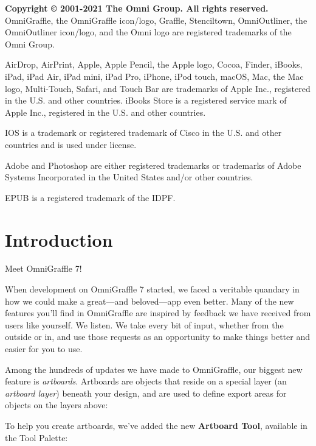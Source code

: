 \documentclass[../main.tex]{subfiles}
\begin{document}
\textbf{Copyright \copyright{} 2001-2021 The Omni Group. All rights reserved.}\\ OmniGraffle,
the OmniGraffle icon/logo, Graffle, Stenciltown, OmniOutliner, the OmniOutliner icon/logo, and
the Omni logo are registered trademarks of the Omni Group.

AirDrop, AirPrint, Apple, Apple Pencil, the Apple logo, Cocoa, Finder, iBooks, iPad, iPad Air,
iPad mini, iPad Pro, iPhone, iPod touch, macOS, Mac, the Mac logo, Multi-Touch, Safari, and
Touch Bar are trademarks of Apple Inc., registered in the U.S. and other countries. iBooks
Store is a registered service mark of Apple Inc., registered in the U.S. and other countries.

IOS is a trademark or registered trademark of Cisco in the U.S. and other countries and is used
under license.

Adobe and Photoshop are either registered trademarks or trademarks of Adobe Systems Incorporated
in the United States and/or other countries.

EPUB is a registered trademark of the IDPF.

\chapter*{Introduction}

Meet OmniGraffle 7!


When development on OmniGraffle 7 started, we faced a veritable quandary in how we could make a
great---and beloved---app even better. Many of the new features you'll find in OmniGraffle are
inspired by feedback we have received from users like yourself. We listen. We take every bit
of input, whether from the outside or in, and use those requests as an opportunity to make
things better and easier for you to use.

Among the hundreds of updates we have made to OmniGraffle, our biggest new feature is
\textit{artboards}. Artboards are objects that reside on a special layer (an \textit{artboard
layer}) beneath your design, and are used to define export areas for objects on the layers
above:


To help you create artboards, we've added the new \textbf{Artboard Tool}, available in the Tool
Palette:
\end{document}
